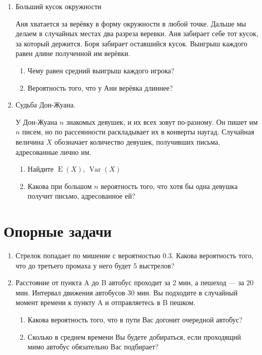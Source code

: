 \documentclass[12pt,a4paper]{article}
\DeclareMathOperator{\Var}{Var}
\DeclareMathOperator{\E}{E}
\begin{document}
\begin{enumerate}
\item Больший кусок окружности

Аня хватается за верёвку в форму окружности в любой точке. Дальше мы делаем в случайных местах два разреза веревки. Аня забирает себе тот кусок, за который держится. Боря забирает оставшийся кусок. Выигрыш каждого равен длине полученной им верёвки. 
\begin{enumerate}
\item Чему равен средний выигрыш каждого игрока?
\item  Вероятность того, что у Ани верёвка длиннее?
\end{enumerate}


\item Судьба Дон-Жуана. 

У Дон-Жуана $n$  знакомых девушек, и их всех зовут по-разному. Он пишет
им $n$  писем, но по рассеянности раскладывает их в конверты
наугад. Случайная величина $X$ обозначает количество девушек, получивших письма, адресованные лично им.

\begin{enumerate}
\item Найдите $\E(X)$, $\Var(X)$
\item Какова при большом $n$ вероятность того, что хотя бы одна девушка получит письмо, адресованное ей?
\end{enumerate}




\end{enumerate}

\section{Опорные задачи}

\begin{enumerate}
\item Стрелок попадает по мишение с вероятностью 0.3. Какова вероятность того, что до третьего промаха у него будет 5 выстрелов?

\item Расстояние от пункта A до B автобус проходит за 2 мин, а пешеход — за 20 мин. Интервал движения автобусов 30 мин. Вы подходите в случайный момент времени к пункту A и отправляетесь в B пешком. 

\begin{enumerate}
\item Какова вероятность того, что в пути Вас догонит очередной автобус?
\item Сколько в среднем времени Вы будете добираться, если проходящий мимо автобус обязательно Вас подбирает?
\end{enumerate}


\end{enumerate}
\end{document}
